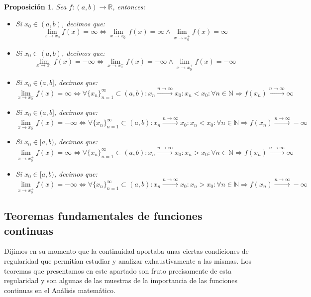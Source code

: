 \documentclass[10pt,a4paper,openright]{book}
\theoremstyle{break}
\newtheorem{prop}{Proposición}[chapter]
\begin{document}
\begin{prop}
Sea $f: (a,b)\longrightarrow \mathbb R$, entonces:
\begin{itemize}
\item Si $x_0\in (a,b)$, decimos que:
$$\lim_{x\rightarrow x_0}f(x)=\infty\Leftrightarrow \lim_{x\rightarrow x_0^-}f(x)=\infty \wedge \lim_{x\rightarrow x_0^+}f(x)=\infty$$

\item Si $x_0\in (a,b)$, decimos que:
$$\lim_{x\rightarrow x_0}f(x)=-\infty\Leftrightarrow \lim_{x\rightarrow x_0^-}f(x)=-\infty \wedge \lim_{x\rightarrow x_0^+}f(x)=-\infty$$

\item Si $x_0\in (a,b]$, decimos que:
$$\lim_{x\rightarrow x_0^-}f(x)=\infty\Leftrightarrow \forall \{x_n\}_{n=1}^\infty \subset (a,b): x_n\xrightarrow{n\rightarrow\infty} x_0: x_n<x_0: \forall n\in \mathbb N\Rightarrow f(x_n)\xrightarrow{n\rightarrow \infty} \infty$$

\item Si $x_0\in (a,b]$, decimos que:
$$\lim_{x\rightarrow x_0^-}f(x)=-\infty\Leftrightarrow \forall \{x_n\}_{n=1}^\infty \subset (a,b): x_n\xrightarrow{n\rightarrow\infty} x_0: x_n<x_0: \forall n\in \mathbb N\Rightarrow f(x_n)\xrightarrow{n\rightarrow \infty} -\infty$$

\item Si $x_0\in [a,b)$, decimos que:
$$\lim_{x\rightarrow x_0^+}f(x)=\infty\Leftrightarrow \forall \{x_n\}_{n=1}^\infty \subset (a,b): x_n\xrightarrow{n\rightarrow\infty} x_0: x_n>x_0: \forall n\in \mathbb N\Rightarrow f(x_n)\xrightarrow{n\rightarrow \infty} \infty$$

\item Si $x_0\in [a,b)$, decimos que:
$$\lim_{x\rightarrow x_0^+}f(x)=-\infty\Leftrightarrow \forall \{x_n\}_{n=1}^\infty \subset (a,b): x_n\xrightarrow{n\rightarrow\infty} x_0: x_n>x_0: \forall n\in \mathbb N\Rightarrow f(x_n)\xrightarrow{n\rightarrow \infty} -\infty$$
\end{itemize}
\end{prop}

\subsection{Teoremas fundamentales de funciones continuas}
Dijimos en su momento que la continuidad aportaba unas ciertas condiciones de regularidad que permitían estudiar y analizar exhaustivamente a las mismas. Los teoremas que presentamos en este apartado son fruto precisamente de esta regularidad y son algunas de las muestras de la importancia de las funciones continuas en el Análisis matemático.
\end{document}
